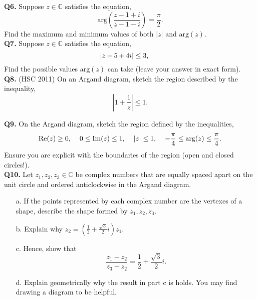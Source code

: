 \documentclass{article}
\begin{document}
\textbf{Q6.} Suppose $z\in \mathbb{C}$ satisfies the equation,
$$
\text{arg}\left( \frac{z-1+i}{z-1-i} \right) = \frac{\pi}{2}.
$$
Find the maximum and minimum values of both $|z|$ and $\text{arg}(z).$ \\

\textbf{Q7.} Suppose $z \in \mathbb{C}$ satisfies the equation,
$$
\left| z - 5 + 4i\right| \le 3, \hspace{0.6cm} 
$$
Find the possible values $\text{arg}(z)$ can take (leave your answer in exact form). \\

\textbf{Q8.} (HSC 2011) On an Argand diagram, sketch the region described by the inequality,
$$\left|1 + \frac{1}{z} \right| \le 1.$$

\textbf{Q9.} On the Argand diagram, sketch the region defined by the inequalities,
$$
\text{Re}(z) \ge 0, \hspace{0.4cm} 0 \le \text{Im}(z) \le 1, \hspace{0.4cm} |z| \le 1, \hspace{0.4cm} -\frac{\pi}{4} \le \text{arg}(z) \le \frac{\pi}{4}.
$$
Ensure you are explicit with the boundaries of the region (open and closed circles!). \\

\textbf{Q10.} Let $z_1, z_2, z_3 \in \mathbb{C}$ be complex numbers that are equally spaced apart on the unit circle and ordered anticlockwise in the Argand diagram.
\begin{enumerate}
    \item[a.] If the points represented by each complex number are the vertexes of a shape, describe the shape formed by $z_1, z_2, z_3.$
    \item[b.] Explain why $z_2 = \left( \frac{1}{2} + \frac{\sqrt{3}}{2}i \right) z_1.$
    \item[c.] Hence, show that
    $$
    \frac{z_1-z_2}{z_3-z_2} = \frac{1}{2} + \frac{\sqrt{3}}{2}i.
    $$
    \item[d.] Explain geometrically why the result in part c is holds. You may find drawing a diagram to be helpful.
\end{enumerate}

 
\end{document}
